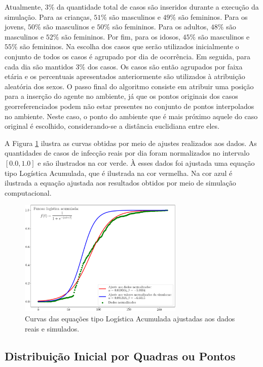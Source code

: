 Atualmente, $3\%$ da quantidade total de casos são inseridos durante a execução da simulação. Para as crianças, $51\%$ são masculinos e $49\%$ são femininos. Para os jovens, $50\%$ são masculinos e $50\%$ são femininos. Para os adultos, $48\%$ são masculinos e $52\%$ são femininos. Por fim, para os idosos, $45\%$ são masculinos e $55\%$ são femininos. Na escolha dos casos que serão utilizados inicialmente o conjunto de todos os casos é agrupado por dia de ocorrência. Em seguida, para cada dia são mantidos $3\%$ dos casos. Os casos são então agrupados por faixa etária e os percentuais apresentados anteriormente são utilizados à atribuição aleatória dos sexos. O passo final do algoritmo consiste em atribuir uma posição para a inserção do agente no ambiente, já que os pontos originais dos casos georreferenciados podem não estar presentes no conjunto de pontos interpolados no ambiente. Neste caso, o ponto do ambiente que é mais próximo aquele do caso original é escolhido, considerando-se a distância euclidiana entre eles. 

A Figura \ref{fig:funcoes_logistica} ilustra as curvas obtidas por meio de ajustes realizados aos dados. As quantidades de casos de infecção reais por dia foram normalizados no intervalo $[0.0, 1.0]$ e são ilustrados na cor verde. À esses dados foi ajustada uma equação tipo Logística Acumulada, que é ilustrada na cor vermelha. Na cor azul é ilustrada a equação ajustada aos resultados obtidos por meio de simulação computacional. 

\begin{figure}[H]
  \centering
  \includegraphics[width=0.7\textwidth]{Figuras/Observacoes/Logistica.png}
  \caption{Curvas das equações tipo Logística Acumulada ajustadas aos dados reais e simulados. }
  \label{fig:funcoes_logistica}
\end{figure} 

\subsection{Distribuição Inicial por Quadras ou Pontos}

